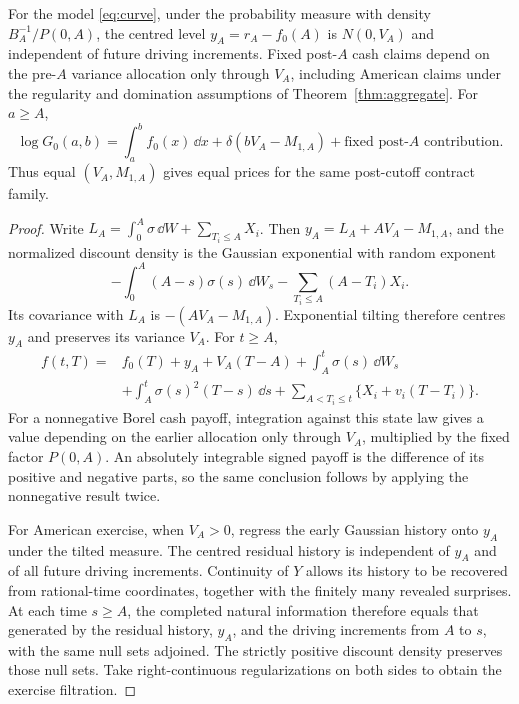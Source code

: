 \begin{corollary}\label{cor:generalaggregate}
For the model \eqref{eq:curve}, under the probability measure with density
$B_A^{-1}/P(0,A)$, the centred level $y_A=r_A-f_0(A)$ is $N(0,V_A)$ and independent of future driving increments. Fixed post-$A$ cash claims depend on the pre-$A$ variance allocation only through $V_A$, including American claims under the regularity and domination assumptions of Theorem~\ref{thm:aggregate}. For $a\geq A$,
\[
\log G_0(a,b)=\int_a^b f_0(x)\,\dd x+\delta(bV_A-M_{1,A})
                   +\text{fixed post-$A$ contribution}.
\]
Thus equal $(V_A,M_{1,A})$ gives equal prices for the same post-cutoff contract family.
\end{corollary}
\begin{proof}
Write $L_A=\int_0^A\sigma\,\dd W+\sum_{T_i\leq A}X_i$. Then
$y_A=L_A+AV_A-M_{1,A}$, and the normalized discount density is the Gaussian exponential with random exponent
\[
-\int_0^A(A-s)\sigma(s)\,\dd W_s-\sum_{T_i\leq A}(A-T_i)X_i.
\]
Its covariance with $L_A$ is $-(AV_A-M_{1,A})$. Exponential tilting therefore centres $y_A$ and preserves its variance $V_A$. For $t\geq A$,
\begin{align*}
f(t,T)={}&f_0(T)+y_A+V_A(T-A)+\int_A^t\sigma(s)\,\dd W_s\\
&+\int_A^t\sigma(s)^2(T-s)\,\dd s
  +\sum_{A<T_i\leq t}\{X_i+v_i(T-T_i)\}.
\end{align*}
For a nonnegative Borel cash payoff, integration against this state law gives a value depending on the earlier allocation only through $V_A$, multiplied by the fixed factor $P(0,A)$. An absolutely integrable signed payoff is the difference of its positive and negative parts, so the same conclusion follows by applying the nonnegative result twice.

For American exercise, when $V_A>0$, regress the early Gaussian history onto $y_A$ under the tilted measure. The centred residual history is independent of $y_A$ and of all future driving increments. Continuity of $Y$ allows its history to be recovered from rational-time coordinates, together with the finitely many revealed surprises. At each time $s\geq A$, the completed natural information therefore equals that generated by the residual history, $y_A$, and the driving increments from $A$ to $s$, with the same null sets adjoined. The strictly positive discount density preserves those null sets. Take right-continuous regularizations on both sides to obtain the exercise filtration.


\end{proof}
